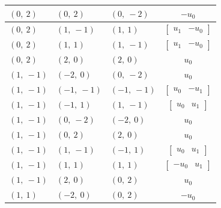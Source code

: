 \documentclass[11pt]{article}
\theoremstyle{definition}
\begin{document}
\begin{longtable}{|l|l|l|c|}
    \hline
    $\left( 0, \  2\right)$ & $\left( 0, \  2\right)$ & $\left( 0, \  -2\right)$ & $- u_{0}$ \\
    \hline
    $\left( 0, \  2\right)$ & $\left( 1, \  -1\right)$ & $\left( 1, \  1\right)$ & $\left[\begin{matrix}u_{1} & - u_{0}\end{matrix}\right]$ \\
    \hline
    $\left( 0, \  2\right)$ & $\left( 1, \  1\right)$ & $\left( 1, \  -1\right)$ & $\left[\begin{matrix}u_{1} & - u_{0}\end{matrix}\right]$ \\
    \hline
    $\left( 0, \  2\right)$ & $\left( 2, \  0\right)$ & $\left( 2, \  0\right)$ & $u_{0}$ \\
    \hline
    $\left( 1, \  -1\right)$ & $\left( -2, \  0\right)$ & $\left( 0, \  -2\right)$ & $u_{0}$ \\
    \hline
    $\left( 1, \  -1\right)$ & $\left( -1, \  -1\right)$ & $\left( -1, \  -1\right)$ & $\left[\begin{matrix}u_{0} & - u_{1}\end{matrix}\right]$ \\
    \hline
    $\left( 1, \  -1\right)$ & $\left( -1, \  1\right)$ & $\left( 1, \  -1\right)$ & $\left[\begin{matrix}u_{0} & u_{1}\end{matrix}\right]$ \\
    \hline
    $\left( 1, \  -1\right)$ & $\left( 0, \  -2\right)$ & $\left( -2, \  0\right)$ & $u_{0}$ \\
    \hline
    $\left( 1, \  -1\right)$ & $\left( 0, \  2\right)$ & $\left( 2, \  0\right)$ & $u_{0}$ \\
    \hline
    $\left( 1, \  -1\right)$ & $\left( 1, \  -1\right)$ & $\left( -1, \  1\right)$ & $\left[\begin{matrix}u_{0} & u_{1}\end{matrix}\right]$ \\
    \hline
    $\left( 1, \  -1\right)$ & $\left( 1, \  1\right)$ & $\left( 1, \  1\right)$ & $\left[\begin{matrix}- u_{0} & u_{1}\end{matrix}\right]$ \\
    \hline
    $\left( 1, \  -1\right)$ & $\left( 2, \  0\right)$ & $\left( 0, \  2\right)$ & $u_{0}$ \\
    \hline
    $\left( 1, \  1\right)$ & $\left( -2, \  0\right)$ & $\left( 0, \  2\right)$ & $- u_{0}$ \\

\end{longtable}
\end{document}
